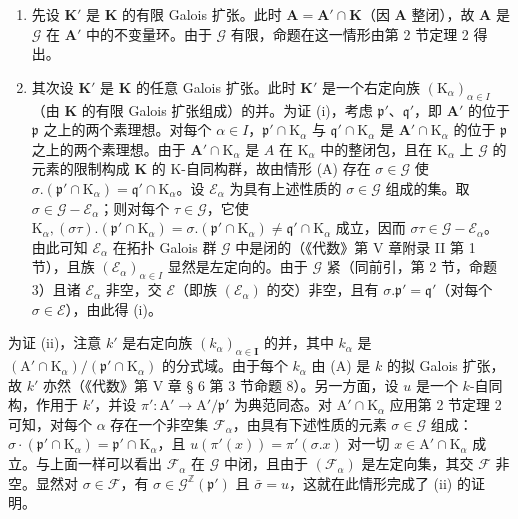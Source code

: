 \begin{enumerate}
\def\labelenumi{(\Alph{enumi})}
\item
  先设 \(\mathbf{K}'\) 是 \(\mathbf{K}\) 的有限 Galois 扩张。此时 \(\mathbf{A} = \mathbf{A}' \cap \mathbf{K}\)（因 \(\mathbf{A}\) 整闭），故 \(\mathbf{A}\) 是 \(\mathcal{G}\) 在 \(\mathbf{A}'\) 中的不变量环。由于 \(\mathcal{G}\) 有限，命题在这一情形由第 2 节定理 2 得出。
\item
  其次设 \(\mathbf{K}'\) 是 \(\mathbf{K}\) 的任意 Galois 扩张。此时 \(\mathbf{K}'\) 是一个右定向族 \((\mathrm{K}_{\alpha})_{\alpha \in I}\)（由 \(\mathbf{K}\) 的有限 Galois 扩张组成）的并。为证 (i)，考虑 \(\mathfrak{p}'\)、\(\mathfrak{q}'\)，即 \(\mathbf{A}'\) 的位于 \(\mathfrak{p}\) 之上的两个素理想。对每个 \(\alpha \in I\)，\(\mathfrak{p}' \cap \mathrm{K}_{\alpha}\) 与 \(\mathfrak{q}' \cap \mathrm{K}_{\alpha}\) 是 \(\mathbf{A}' \cap \mathrm{K}_{\alpha}\) 的位于 \(\mathfrak{p}\) 之上的两个素理想。由于 \(\mathbf{A}' \cap \mathrm{K}_{\alpha}\) 是 \(A\) 在 \(\mathrm{K}_{\alpha}\) 中的整闭包，且在 \(\mathrm{K}_{\alpha}\) 上 \(\mathcal{G}\) 的元素的限制构成 \(\mathbf{K}\) 的 K-自同构群，故由情形 (A) 存在 \(\sigma \in \mathcal{G}\) 使 \(\sigma. (\mathfrak{p}' \cap \mathrm{K}_{\alpha}) = \mathfrak{q}' \cap \mathrm{K}_{\alpha}\)。设 \(\mathcal{E}_{\alpha}\) 为具有上述性质的 \(\sigma \in \mathcal{G}\) 组成的集。取 \(\sigma \in \mathcal{G} - \mathcal{E}_{\alpha}\)；则对每个 \(\tau \in \mathcal{G}\)，它使 \(\mathrm{K}_{\alpha}, (\sigma \tau). (\mathfrak{p}' \cap \mathrm{K}_{\alpha}) = \sigma. (\mathfrak{p}' \cap \mathrm{K}_{\alpha}) \neq \mathfrak{q}' \cap \mathrm{K}_{\alpha}\) 成立，因而 \(\sigma \tau \in \mathcal{G} - \mathcal{E}_{\alpha}\)。由此可知 \(\mathcal{E}_{\alpha}\) 在拓扑 Galois 群 \(\mathcal{G}\) 中是闭的（《代数》第 V 章附录 II 第 1 节），且族 \((\mathcal{E}_{\alpha})_{\alpha \in I}\) 显然是左定向的。由于 \(\mathcal{G}\) 紧（同前引，第 2 节，命题 3）且诸 \(\mathcal{E}_{\alpha}\) 非空，交 \(\mathcal{E}\)（即族 \((\mathcal{E}_{\alpha})\) 的交）非空，且有 \(\sigma. \mathfrak{p}' = \mathfrak{q}'\)（对每个 \(\sigma \in \mathcal{E}\)），由此得 (i)。
\end{enumerate}

为证 (ii)，注意 \(k'\) 是右定向族 \((k_{\alpha})_{\alpha \in \mathbf{I}}\) 的并，其中 \(k_{\alpha}\) 是 \((\mathrm{A}' \cap \mathrm{K}_{\alpha}) / (\mathfrak{p}' \cap \mathrm{K}_{\alpha})\) 的分式域。由于每个 \(k_{\alpha}\) 由 (A) 是 \(k\) 的拟 Galois 扩张，故 \(k'\) 亦然（《代数》第 V 章 § 6 第 3 节命题 8）。另一方面，设 \(u\) 是一个 \(k\)-自同构，作用于 \(k'\)，并设 \(\pi': \mathrm{A}' \to \mathrm{A}' / \mathfrak{p}'\) 为典范同态。对 \(\mathrm{A}' \cap \mathrm{K}_{\alpha}\) 应用第 2 节定理 2 可知，对每个 \(\alpha\) 存在一个非空集 \(\mathcal{F}_{\alpha}\)，由具有下述性质的元素 \(\sigma \in \mathcal{G}\) 组成：\(\sigma \cdot (\mathfrak{p}' \cap \mathrm{K}_{\alpha}) = \mathfrak{p}' \cap \mathrm{K}_{\alpha}\)，且 \(u(\pi'(x)) = \pi'(\sigma.x)\) 对一切 \(x \in \mathrm{A}' \cap \mathrm{K}_{\alpha}\) 成立。与上面一样可以看出 \(\mathcal{F}_{\alpha}\) 在 \(\mathcal{G}\) 中闭，且由于 \((\mathcal{F}_{\alpha})\) 是左定向集，其交 \(\mathcal{F}\) 非空。显然对 \(\sigma \in \mathcal{F}\)，有 \(\sigma \in \mathcal{G}^{\mathbb{Z}}(\mathfrak{p}')\) 且 \(\bar{\sigma} = u\)，这就在此情形完成了 (ii) 的证明。

